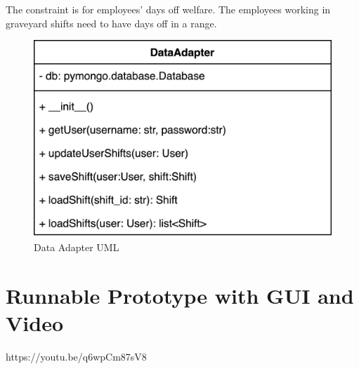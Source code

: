 \documentclass[11pt, oneside]{article}   	%
\begin{document}
The constraint is for employees' days off welfare. The employees working in graveyard shifts need to have days off in a range.


\begin{figure}
\centering
\includegraphics[scale=0.05]{dataadapter}
\caption{Data Adapter UML}
\label{dataadapteruml}
\end{figure}

\section{Runnable Prototype with GUI and Video}
https://youtu.be/q6wpCm87sV8

\section{}
\end{document}
